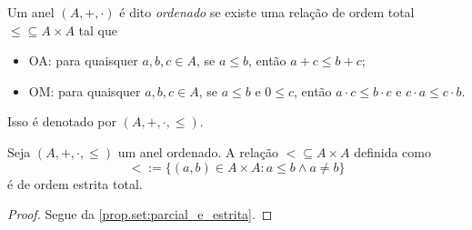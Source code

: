 \begin{definition}
    Um anel $(A, +, \cdot)$ é dito \emph{ordenado} se existe uma relação de ordem total ${\leq} \subseteq A \times A$ tal que
        \begin{itemize}
            \item OA: para quaisquer $a,b,c \in A$, se $a \leq b$, então $a+c \leq b+c$;
            \item OM: para quaisquer $a,b,c \in A$, se $a \leq b$ e $0 \leq c$, então $a \cdot c \leq b \cdot c$ e $c \cdot a \leq c \cdot b$.
        \end{itemize}
    Isso é denotado por $(A, +, \cdot, \leq)$.
\end{definition}

\begin{proposition}
    Seja $(A,+,\cdot,\leq)$ um anel ordenado. A relação ${<} \subseteq A \times A$ definida como
        \[
            {<} := \{(a,b) \in A \times A : a \leq b \land a \neq b\}
        \]
    é de ordem estrita total.
\end{proposition}

\begin{proof}
    Segue da \cref{prop.set:parcial_e_estrita}. \blackproof
\end{proof}

